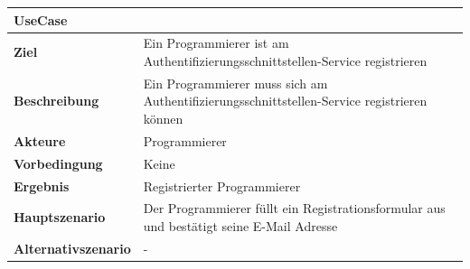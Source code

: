 \begin{longtable}[c]{@{}ll@{}}
\toprule
\begin{minipage}[b]{0.34\columnwidth}\raggedright\strut
\textbf{UseCase}
\strut\end{minipage} &
\begin{minipage}[b]{0.60\columnwidth}\raggedright\strut
\strut\end{minipage}\tabularnewline
\midrule
\endhead
\begin{minipage}[t]{0.34\columnwidth}\raggedright\strut
\textbf{Ziel}
\strut\end{minipage} &
\begin{minipage}[t]{0.60\columnwidth}\raggedright\strut
Ein Programmierer ist am Authentifizierungsschnittstellen-Service
registrieren
\strut\end{minipage}\tabularnewline
\begin{minipage}[t]{0.34\columnwidth}\raggedright\strut
\textbf{Beschreibung}
\strut\end{minipage} &
\begin{minipage}[t]{0.60\columnwidth}\raggedright\strut
Ein Programmierer muss sich am Authentifizierungsschnittstellen-Service
registrieren können
\strut\end{minipage}\tabularnewline
\begin{minipage}[t]{0.34\columnwidth}\raggedright\strut
\textbf{Akteure}
\strut\end{minipage} &
\begin{minipage}[t]{0.60\columnwidth}\raggedright\strut
Programmierer
\strut\end{minipage}\tabularnewline
\begin{minipage}[t]{0.34\columnwidth}\raggedright\strut
\textbf{Vorbedingung}
\strut\end{minipage} &
\begin{minipage}[t]{0.60\columnwidth}\raggedright\strut
Keine
\strut\end{minipage}\tabularnewline
\begin{minipage}[t]{0.34\columnwidth}\raggedright\strut
\textbf{Ergebnis}
\strut\end{minipage} &
\begin{minipage}[t]{0.60\columnwidth}\raggedright\strut
Registrierter Programmierer
\strut\end{minipage}\tabularnewline
\begin{minipage}[t]{0.34\columnwidth}\raggedright\strut
\textbf{Hauptszenario}
\strut\end{minipage} &
\begin{minipage}[t]{0.60\columnwidth}\raggedright\strut
Der Programmierer füllt ein Registrationsformular aus und bestätigt
seine E-Mail Adresse
\strut\end{minipage}\tabularnewline
\begin{minipage}[t]{0.34\columnwidth}\raggedright\strut
\textbf{Alternativszenario}
\strut\end{minipage} &
\begin{minipage}[t]{0.60\columnwidth}\raggedright\strut
-
\strut\end{minipage}\tabularnewline
\bottomrule
\end{longtable}

